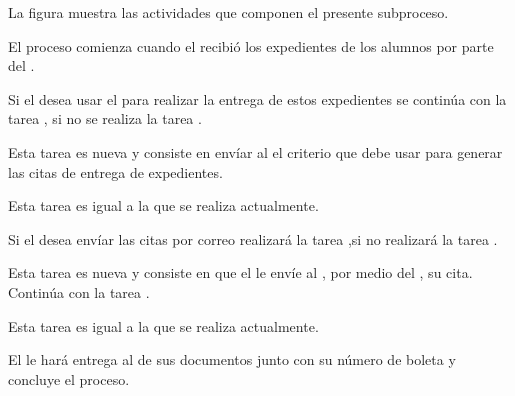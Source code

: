 La figura  muestra las actividades que componen el presente subproceso.


\begin{PDescripcion}
	
	\Ppaso [\Einicio] El proceso comienza cuando el  recibió los expedientes de los alumnos por parte del .
	
	\Ppaso [\iCompuerta] Si el  desea usar el  para realizar la entrega de estos expedientes se continúa con la tarea , si no se realiza la tarea .
	
	\Ppaso [\itarea]  Esta tarea es nueva y consiste en envíar al  el criterio que debe usar para generar las citas de entrega de expedientes.
	
	\Ppaso [\itarea]  Esta tarea es igual a la que se realiza actualmente.
	
	\Ppaso [\iCompuerta] Si el  desea envíar las citas por correo realizará la tarea ,si no realizará la tarea .
	
	\Ppaso [\itarea]  Esta tarea es nueva y consiste en que el  le envíe al , por medio del , su cita. Continúa con la tarea .
	
	\Ppaso [\itarea]  Esta tarea es igual a la que se realiza actualmente.
	
	\Ppaso [\itarea]  El  le hará entrega al  de sus documentos junto con su número de boleta y concluye el proceso. 
	
	
	
\end{PDescripcion}
